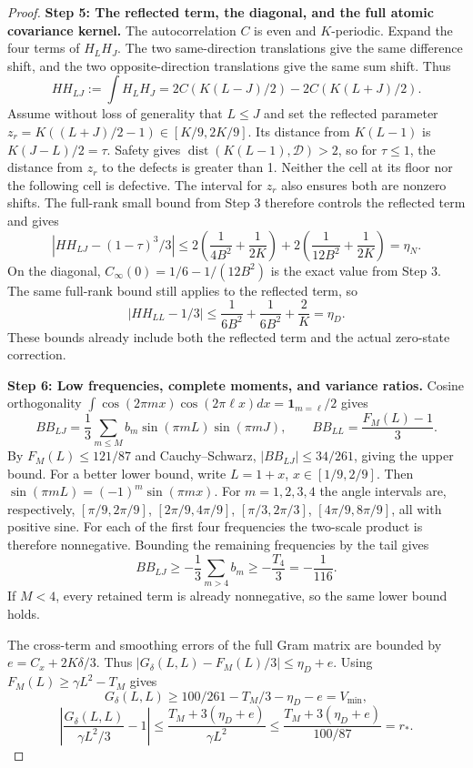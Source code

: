 \documentclass[a4paper,11pt]{article}
\theoremstyle{remark}
\begin{document}
\begin{proof}
\textbf{Step 5: The reflected term, the diagonal, and the full atomic covariance kernel.}
The autocorrelation $C$ is even and $K$-periodic. Expand the four terms of $H_LH_J$.
The two same-direction translations give the same difference shift, and the two opposite-direction translations give the same sum shift. Thus
\[
 HH_{LJ}:=\int H_LH_J
 =2C(K(L-J)/2)-2C(K(L+J)/2).
\]
Assume without loss of generality that $L\le J$ and set the reflected parameter
$z_r=K((L+J)/2-1)\in[K/9,2K/9]$. Its distance from $K(L-1)$ is
$K(J-L)/2=\tau$. Safety gives $\operatorname{dist}(K(L-1),\mathcal D)>2$,
so for $\tau\le1$, the distance from $z_r$ to the defects is greater than 1. Neither the cell at its floor nor the following cell
is defective. The interval for $z_r$ also ensures both are nonzero shifts.
The full-rank small bound from Step 3 therefore controls the reflected term and gives
\[
 |HH_{LJ}-(1-\tau)^3/3|
 \le2\left(\frac1{4B^2}+\frac1{2K}\right)
 +2\left(\frac1{12B^2}+\frac1{2K}\right)=\eta_N.
\]
On the diagonal, $C_\infty(0)=1/6-1/(12B^2)$ is the exact value from Step 3.
The same full-rank bound still applies to the reflected term, so
\[
 |HH_{LL}-1/3|
 \le\frac1{6B^2}+\frac1{6B^2}+\frac2K=\eta_D.
\]
These bounds already include both the reflected term and the actual zero-state correction.

\textbf{Step 6: Low frequencies, complete moments, and variance ratios.}
Cosine orthogonality $\int\cos(2\pi mx)\cos(2\pi\ell x)dx=
\mathbf1_{m=\ell}/2$ gives
\[
 BB_{LJ}=\frac13\sum_{m\le M}b_m\sin(\pi mL)\sin(\pi mJ),
 \qquad BB_{LL}=\frac{F_M(L)-1}{3}.
\]
By $F_M(L)\le121/87$ and Cauchy--Schwarz, $|BB_{LJ}|\le34/261$, giving the upper bound.
For a better lower bound, write $L=1+x$, $x\in[1/9,2/9]$. Then
$\sin(\pi mL)=(-1)^m\sin(\pi mx)$.
For $m=1,2,3,4$ the angle intervals are, respectively,
$[\pi/9,2\pi/9]$, $[2\pi/9,4\pi/9]$, $[\pi/3,2\pi/3]$,
$[4\pi/9,8\pi/9]$, all with positive sine. For each of the first four frequencies the two-scale product is therefore nonnegative.
Bounding the remaining frequencies by the tail gives
\[
 BB_{LJ}\ge-\frac13\sum_{m>4}b_m\ge-\frac{T_4}{3}=-\frac1{116}.
\]
If $M<4$, every retained term is already nonnegative, so the same lower bound holds.

The cross-term and smoothing errors of the full Gram matrix are bounded by $e=C_x+2K\delta/3$.
Thus $|G_\delta(L,L)-F_M(L)/3|\le\eta_D+e$.
Using $F_M(L)\ge\gamma L^2-T_M$ gives
\[
 G_\delta(L,L)\ge100/261-T_M/3-\eta_D-e=V_{\min},
\]
\[
 \left|\frac{G_\delta(L,L)}{\gamma L^2/3}-1\right|
 \le\frac{T_M+3(\eta_D+e)}{\gamma L^2}
 \le\frac{T_M+3(\eta_D+e)}{100/87}=r_*.
\]


\end{proof}
\end{document}
